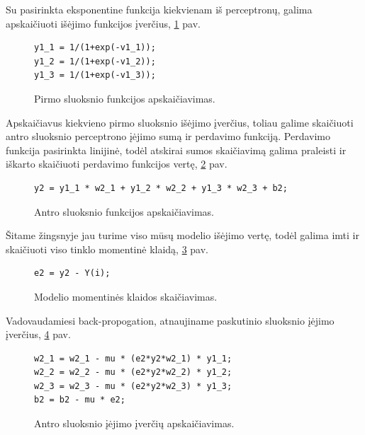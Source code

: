 \documentclass[11pt, a4paper, lithuanian]{article}
\begin{document}
    Su pasirinkta eksponentine funkcija kiekvienam iš perceptronų, galima apskaičiuoti išėjimo funkcijos įverčius, \ref{code:pirmo_sluoksnio_funkcijos_apskaiciavimas} pav.

    \begin{figure}[h]
      \centering
      \caption{Pirmo sluoksnio funkcijos apskaičiavimas.}
      \label{code:pirmo_sluoksnio_funkcijos_apskaiciavimas}
      \begin{lstlisting}
y1_1 = 1/(1+exp(-v1_1));
y1_2 = 1/(1+exp(-v1_2));
y1_3 = 1/(1+exp(-v1_3));
      \end{lstlisting}
    \end{figure}

    Apskaičiavus kiekvieno pirmo sluoksnio išėjimo įverčius, toliau galime skaičiuoti antro sluoksnio perceptrono įėjimo sumą ir perdavimo funkciją. Perdavimo funkcija pasirinkta linijinė, todėl atskirai sumos skaičiavimą galima praleisti ir iškarto skaičiuoti perdavimo funkcijos vertę, \ref{code:antro_sluoksnio_funkcijos_apskaiciavimas} pav.

    \begin{figure}[h]
      \centering
      \caption{Antro sluoksnio funkcijos apskaičiavimas.}
      \label{code:antro_sluoksnio_funkcijos_apskaiciavimas}
      \begin{lstlisting}
y2 = y1_1 * w2_1 + y1_2 * w2_2 + y1_3 * w2_3 + b2;
      \end{lstlisting}
    \end{figure}

    Šitame žingsnyje jau turime viso mūsų modelio išėjimo vertę, todėl galima imti ir skaičiuoti viso tinklo momentinė klaidą, \ref{code:modelio_klaidos_skaiciavimas} pav.

    \begin{figure}[h]
      \centering
      \caption{Modelio momentinės klaidos skaičiavimas.}
      \label{code:modelio_klaidos_skaiciavimas}
      \begin{lstlisting}
e2 = y2 - Y(i);
      \end{lstlisting}
    \end{figure}

    Vadovaudamiesi back-propogation, atnaujiname paskutinio sluoksnio įėjimo įverčius, \ref{code:antro_sluoksnio_iejimo_iverciu_skaiciavimas} pav.

    \begin{figure}[h]
      \centering
      \caption{Antro sluoksnio įėjimo įverčių apskaičiavimas.}
      \label{code:antro_sluoksnio_iejimo_iverciu_skaiciavimas}
      \begin{lstlisting}
w2_1 = w2_1 - mu * (e2*y2*w2_1) * y1_1;
w2_2 = w2_2 - mu * (e2*y2*w2_2) * y1_2;
w2_3 = w2_3 - mu * (e2*y2*w2_3) * y1_3;
b2 = b2 - mu * e2;
      \end{lstlisting}
    \end{figure}
\end{document}
